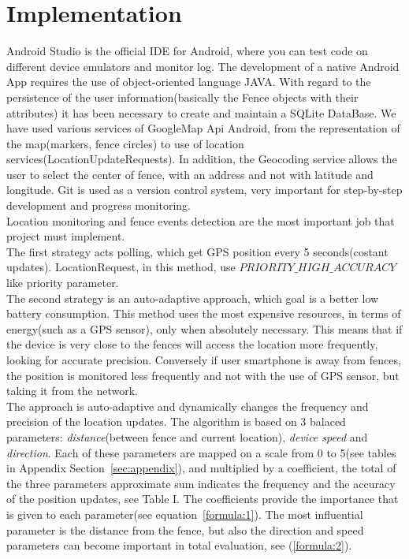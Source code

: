 \documentclass[conference]{IEEEtran}
\begin{document}
\section{Implementation}
\label{sec:implementation}
Android Studio is the official IDE for Android, where you can test code on different device emulators and monitor log.
The development of a native Android App requires the use of object-oriented language JAVA.
With regard to the persistence of the user information(basically the Fence objects with their attributes) it has been necessary to create and maintain a SQLite DataBase.
We have used various services of GoogleMap Api Android, from the representation of the map(markers, fence circles) to use of location services(LocationUpdateRequests).
In addition, the Geocoding service allows the user to select the center of fence, with an address and not with latitude and longitude.
Git is used as a version control system, very important for step-by-step development and progress monitoring.\\
Location monitoring and fence events detection are the most important job that project must implement.\\
The first strategy acts polling, which get GPS position every 5 seconds(costant updates). LocationRequest, in this method, use $PRIORITY\_HIGH\_ACCURACY$ like priority parameter.\\
The second strategy is an auto-adaptive approach, which goal is a better low battery consumption.
This method uses the most expensive resources, in terms of energy(such as a GPS sensor), only when absolutely necessary. 
This means that if the device is very close to the fences will access the location more frequently, looking for accurate precision. 
Conversely if user smartphone is away from fences, the position is monitored less frequently and not with the use of GPS sensor, but taking it from the network.\\
The approach is auto-adaptive and dynamically changes the frequency and precision of the location updates.
The algorithm is based on 3 balaced parameters: \textit{distance}(between fence and current location), \textit{device speed} and \textit{direction}.
Each of these parameters are mapped on a scale from 0 to 5(see tables in Appendix Section~\ref{sec:appendix}), and multiplied by a coefficient, the total of the three parameters approximate sum indicates 
the frequency and the accuracy of the position updates, see Table I.
The coefficients provide the importance that is given to each parameter(see equation~\ref{formula:1}).
The most influential parameter is the distance from the fence, but also the direction and speed parameters can become important in total evaluation, see (\ref{formula:2}).
\end{document}
